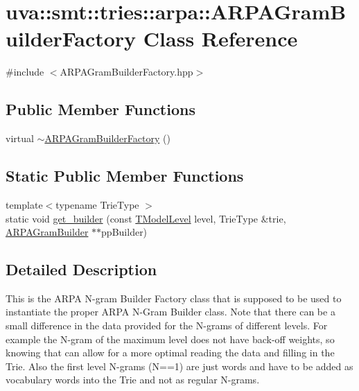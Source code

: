 \hypertarget{classuva_1_1smt_1_1tries_1_1arpa_1_1_a_r_p_a_gram_builder_factory}{}\section{uva\+:\+:smt\+:\+:tries\+:\+:arpa\+:\+:A\+R\+P\+A\+Gram\+Builder\+Factory Class Reference}
\label{classuva_1_1smt_1_1tries_1_1arpa_1_1_a_r_p_a_gram_builder_factory}


{\ttfamily \#include $<$A\+R\+P\+A\+Gram\+Builder\+Factory.\+hpp$>$}

\subsection*{Public Member Functions}
\begin{DoxyCompactItemize}
\item 
virtual \hyperlink{classuva_1_1smt_1_1tries_1_1arpa_1_1_a_r_p_a_gram_builder_factory_a66e551c1d15723bad56b8aa5b91ee87f}{$\sim$\+A\+R\+P\+A\+Gram\+Builder\+Factory} ()
\end{DoxyCompactItemize}
\subsection*{Static Public Member Functions}
\begin{DoxyCompactItemize}
\item 
{\footnotesize template$<$typename Trie\+Type $>$ }\\static void \hyperlink{classuva_1_1smt_1_1tries_1_1arpa_1_1_a_r_p_a_gram_builder_factory_ae94256fdb02fd293efd8f2cb512774e5}{get\+\_\+builder} (const \hyperlink{namespaceuva_1_1smt_1_1tries_a20577a44b3a42d26524250634379b7cb}{T\+Model\+Level} level, Trie\+Type \&trie, \hyperlink{classuva_1_1smt_1_1tries_1_1arpa_1_1_a_r_p_a_gram_builder}{A\+R\+P\+A\+Gram\+Builder} $\ast$$\ast$pp\+Builder)
\end{DoxyCompactItemize}


\subsection{Detailed Description}
This is the A\+R\+P\+A N-\/gram Builder Factory class that is supposed to be used to instantiate the proper A\+R\+P\+A N-\/\+Gram Builder class. Note that there can be a small difference in the data provided for the N-\/grams of different levels. For example the N-\/gram of the maximum level does not have back-\/off weights, so knowing that can allow for a more optimal reading the data and filling in the Trie. Also the first level N-\/grams (N==1) are just words and have to be added as vocabulary words into the Trie and not as regular N-\/grams. 

